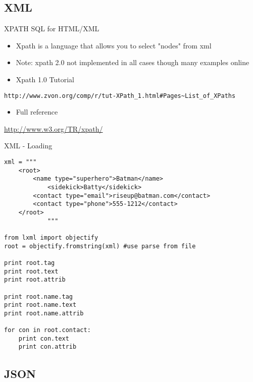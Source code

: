 \documentclass[presentation]{beamer}
\begin{document}
\subsection{XML}
\label{sec-5-2}

\begin{frame}[fragile,label=sec-5-2-1]{XPATH SQL for HTML/XML}
 \begin{itemize}
\item Xpath is a language that allows you to select "nodes" from xml
\item Note: xpath 2.0 not implemented in all cases though many examples online
\item Xpath 1.0 Tutorial
\end{itemize}
\begin{verbatim}
http://www.zvon.org/comp/r/tut-XPath_1.html#Pages~List_of_XPaths
\end{verbatim}
\begin{itemize}
\item Full reference
\end{itemize}
\url{http://www.w3.org/TR/xpath/} 
\end{frame}




\begin{frame}[fragile,shrink=1,label=sec-5-2-2]{XML - Loading}

 \lstset{numbers=left,language=Python,label= ,caption= }
\begin{lstlisting}
xml = """
    <root>
        <name type="superhero">Batman</name>
            <sidekick>Batty</sidekick>
        <contact type="email">riseup@batman.com</contact>
        <contact type="phone">555-1212</contact>
    </root>
            """

from lxml import objectify
root = objectify.fromstring(xml) #use parse from file

print root.tag
print root.text
print root.attrib

print root.name.tag
print root.name.text
print root.name.attrib

for con in root.contact:
    print con.text
    print con.attrib
\end{lstlisting}
\end{frame}


\subsection{JSON}
\label{sec-5-3}
\end{document}
